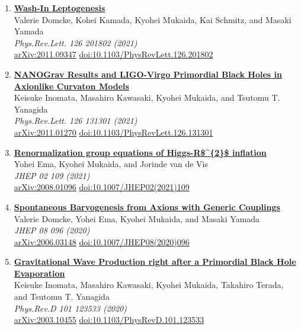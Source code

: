 \begin{enumerate}
\item \textbf{\href{https://arxiv.org/abs/2011.09347}{Wash-In Leptogenesis}}\\
Valerie Domcke, Kohei Kamada, Kyohei Mukaida, Kai Schmitz, and Masaki Yamada\\
\emph{Phys.Rev.Lett. 126 201802 (2021)}
\\ \href{https://arxiv.org/abs/2011.09347}{arXiv:2011.09347} \href{https://doi.org/10.1103/PhysRevLett.126.201802}{doi:10.1103/PhysRevLett.126.201802}

\item \textbf{\href{https://arxiv.org/abs/2011.01270}{NANOGrav Results and LIGO-Virgo Primordial Black Holes in Axionlike Curvaton Models}}\\
Keisuke Inomata, Masahiro Kawasaki, Kyohei Mukaida, and Tsutomu T. Yanagida\\
\emph{Phys.Rev.Lett. 126 131301 (2021)}
\\ \href{https://arxiv.org/abs/2011.01270}{arXiv:2011.01270} \href{https://doi.org/10.1103/PhysRevLett.126.131301}{doi:10.1103/PhysRevLett.126.131301}

\item \textbf{\href{https://arxiv.org/abs/2008.01096}{Renormalization group equations of Higgs-R\$\textasciicircum{}\{2\}\$ inflation}}\\
Yohei Ema, Kyohei Mukaida, and Jorinde van de Vis\\
\emph{JHEP 02 109 (2021)}
\\ \href{https://arxiv.org/abs/2008.01096}{arXiv:2008.01096} \href{https://doi.org/10.1007/JHEP02(2021)109}{doi:10.1007/JHEP02(2021)109}

\item \textbf{\href{https://arxiv.org/abs/2006.03148}{Spontaneous Baryogenesis from Axions with Generic Couplings}}\\
Valerie Domcke, Yohei Ema, Kyohei Mukaida, and Masaki Yamada\\
\emph{JHEP 08 096 (2020)}
\\ \href{https://arxiv.org/abs/2006.03148}{arXiv:2006.03148} \href{https://doi.org/10.1007/JHEP08(2020)096}{doi:10.1007/JHEP08(2020)096}

\item \textbf{\href{https://arxiv.org/abs/2003.10455}{Gravitational Wave Production right after a Primordial Black Hole Evaporation}}\\
Keisuke Inomata, Masahiro Kawasaki, Kyohei Mukaida, Takahiro Terada, and Tsutomu T. Yanagida\\
\emph{Phys.Rev.D 101 123533 (2020)}
\\ \href{https://arxiv.org/abs/2003.10455}{arXiv:2003.10455} \href{https://doi.org/10.1103/PhysRevD.101.123533}{doi:10.1103/PhysRevD.101.123533}


\end{enumerate}
